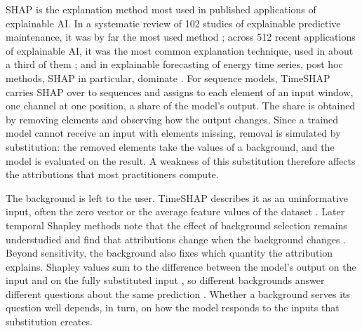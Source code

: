 \documentclass{article}
\begin{document}
SHAP \citep{lundberg2017unified} is the explanation method most used in published applications of explainable AI. In a systematic review of 102 studies of explainable predictive maintenance, it was by far the most used method \citep{cummins2024explainable}; across 512 recent applications of explainable AI, it was the most common explanation technique, used in about a third of them \citep{saarela2024recent}; and in explainable forecasting of energy time series, post hoc methods, SHAP in particular, dominate \citep{arabzadeh2025four}. For sequence models, TimeSHAP carries SHAP over to sequences \citep{bento2021timeshap} and assigns to each element of an input window, one channel at one position, a share of the model's output. The share is obtained by removing elements and observing how the output changes. Since a trained model cannot receive an input with elements missing, removal is simulated by substitution: the removed elements take the values of a background, and the model is evaluated on the result. A weakness of this substitution therefore affects the attributions that most practitioners compute.

The background is left to the user. TimeSHAP describes it as an uninformative input, often the zero vector or the average feature values of the dataset \citep{bento2021timeshap}. Later temporal Shapley methods note that the effect of background selection remains understudied \citep{nguyen2025tshap} and find that attributions change when the background changes \citep{kim2026groupsegment, papadeas2026empirical}. Beyond sensitivity, the background also fixes which quantity the attribution explains. Shapley values sum to the difference between the model's output on the input and on the fully substituted input \citep{sundararajan2020many}, so different backgrounds answer different questions about the same prediction \citep{merrick2020explanation, mamalakis2023carefully}. Whether a background serves its question well depends, in turn, on how the model responds to the inputs that substitution creates.
\end{document}
